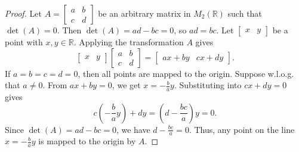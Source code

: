 \begin{proof}
    Let $A = \begin{bmatrix}a & b \\ c & d\end{bmatrix}$ be an arbitrary matrix in $M_2(\mathbb{R})$ 
    such that $\det(A) = 0$. Then $\det(A) = ad - bc = 0$, so $ad = bc$.
    Let $\begin{bmatrix}x & y\end{bmatrix}$ be a point with $x, y \in \mathbb{R}$.  
    Applying the transformation $A$ gives 
    \[
    \begin{bmatrix}x & y\end{bmatrix}\begin{bmatrix}a & b \\ c & d\end{bmatrix} =
    \begin{bmatrix}ax + by & cx + dy\end{bmatrix}.
    \]
    If $a = b = c = d = 0$, then all points are mapped to the origin.  
    Suppose w.l.o.g. that $a \ne 0$. From $ax + by = 0$, we get $x = -\frac{b}{a}y$.  
    Substituting into $cx + dy = 0$ gives 
    \[
    c\left(-\frac{b}{a}y\right) + dy = \left(d - \frac{bc}{a}\right)y = 0.
    \]
    Since $\det(A) = ad - bc = 0$, we have $d - \frac{bc}{a} = 0$.  
    Thus, any point on the line $x = -\frac{b}{a}y$ is mapped to the origin by $A$.
\end{proof}

